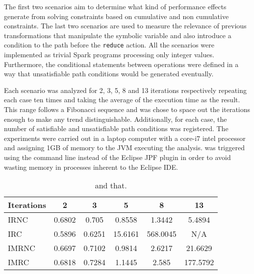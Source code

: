 The first two scenarios aim to determine what kind of performance effects generate from solving constraints based on cumulative and non cumulative constraints. The last two scenarios are used to measure the relevance of previous transformations that manipulate the symbolic variable and also introduce a condition to the path before the \texttt{reduce} action. All the scenarios were implemented as trivial Spark programs processing only integer values. Furthermore, the conditional statements between operations were defined in a way that unsatisfiable path conditions would be generated eventually.

Each scenario was analyzed for 2, 3, 5, 8 and 13 iterations respectively repeating each case ten times and taking the average of the execution time as the result. This range follows a Fibonacci sequence and was chose to space out the iterations enough to make any trend distinguishable. Additionally, for each case, the number of satisfiable and unsatisfiable path conditions was registered. The experiments were carried out in a laptop computer with a core-i7 intel processor and assigning 1GB of memory to the JVM executing the analysis. \jpf{} was triggered using the command line instead of the Eclipse JPF plugin in order to avoid wasting memory in processes inherent to the Eclipse IDE.


\begin{table}[t]
	\centering
	\small
	\begin{tabular*}{0.8\textwidth}{@{\extracolsep{\fill}} lccccc}
		\hline
		Iterations & 2 & 3 & 5 & 8 & 13 \\
		\hline\hline
		IRNC  & 0.6802 & 0.705  & 0.8558  & 1.3442   & 5.4894   \\
		IRC   & 0.5896 & 0.6251 & 15.6161 & 568.0045 & N/A      \\
		IMRNC & 0.6697 & 0.7102 & 0.9814  & 2.6217   & 21.6629  \\
		IMRC  & 0.6818 & 0.7284 & 1.1445  & 2.585    & 177.5792 \\
		\hline	
	\end{tabular*}	
	\caption[This]{and that.}
	\label{tab:evaluation:quantitative-time}
\end{table}

